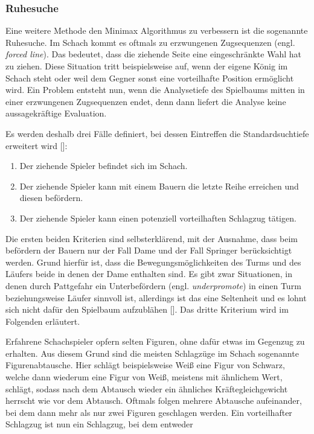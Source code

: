 \subsubsection{Ruhesuche}

Eine weitere Methode den Minimax Algorithmus zu verbessern ist die sogenannte Ruhesuche.
Im Schach kommt es oftmals zu erzwungenen Zugsequenzen (engl. \textit{forced line}).
Das bedeutet, dass die ziehende Seite eine eingeschränkte Wahl hat zu ziehen.
Diese Situation tritt beispielsweise auf, wenn der eigene König im Schach steht oder weil dem Gegner sonst eine vorteilhafte Position ermöglicht wird.
Ein Problem entsteht nun, wenn die Analysetiefe des Spielbaums mitten in einer erzwungenen Zugsequenzen endet, denn dann liefert die Analyse keine aussagekräftige Evaluation.

Es werden deshalb drei Fälle definiert, bei dessen Eintreffen die Standardsuchtiefe erweitert wird [\cite{Stuckardt}]:

\begin{enumerate}
    \item Der ziehende Spieler befindet sich im Schach.
    \item Der ziehende Spieler kann mit einem Bauern die letzte Reihe erreichen und diesen befördern.
    \item Der ziehende Spieler kann einen potenziell vorteilhaften Schlagzug tätigen.
\end{enumerate}

Die ersten beiden Kriterien sind selbsterklärend, mit der Ausnahme, dass beim befördern der Bauern nur der Fall Dame und der Fall Springer berücksichtigt werden.
Grund hierfür ist, dass die Bewegungsmöglichkeiten des Turms und des Läufers beide in denen der Dame enthalten sind.
Es gibt zwar Situationen, in denen durch Pattgefahr ein Unterbefördern (engl. \textit{underpromote}) in einen Turm beziehungsweise Läufer sinnvoll ist, allerdings ist das eine Seltenheit und es lohnt sich nicht dafür den Spielbaum aufzublähen [\cite{Stuckardt}].
Das dritte Kriterium wird im Folgenden erläutert.

Erfahrene Schachspieler opfern selten Figuren, ohne dafür etwas im Gegenzug zu erhalten.
Aus diesem Grund sind die meisten Schlagzüge im Schach sogenannte Figurenabtausche.
Hier schlägt beispielsweise Weiß eine Figur von Schwarz, welche dann wiederum eine Figur von Weiß, meistens mit ähnlichem Wert, schlägt, sodass nach dem Abtausch wieder ein ähnliches Kräftegleichgewicht herrscht wie vor dem Abtausch.
Oftmals folgen mehrere Abtausche aufeinander, bei dem dann mehr als nur zwei Figuren geschlagen werden.
Ein vorteilhafter Schlagzug ist nun ein Schlagzug, bei dem entweder

